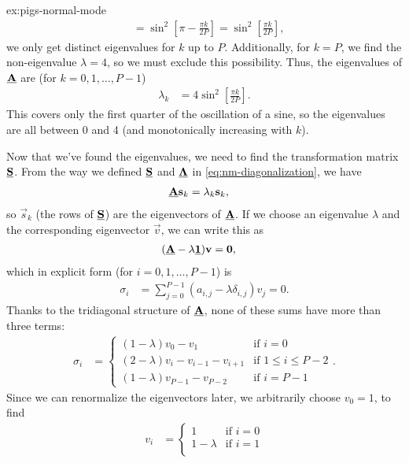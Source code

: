 \begin{DefAnswer}{ex:pigs-normal-mode}
\begin{align}
		&= \sin^2{\left[ \pi - \frac{\pi k}{2 P} \right]}
		= \sin^2{\left[ \frac{\pi k}{2 P} \right]},
	\end{align}
	we only get distinct eigenvalues for $k$ up to $P$.
	Additionally, for $k = P$, we find the non-eigenvalue $\lambda = 4$, so we must exclude this possibility.
	Thus, the eigenvalues of $\underline{\bm{\mathbf{A}}}$ are (for $k = 0, 1, \ldots, P - 1$)
	\begin{align}
		\lambda_k
		&= 4 \sin^2{\left[ \frac{\pi k}{2 P} \right]}.
	\end{align}
	This covers only the first quarter of the oscillation of a sine, so the eigenvalues are all between 0 and 4 (and monotonically increasing with $k$).

	Now that we've found the eigenvalues, we need to find the transformation matrix $\underline{\bm{\mathbf{S}}}$.
	From the way we defined $\underline{\bm{\mathbf{S}}}$ and $\underline{\bm{\mathbf{\Lambda}}}$ in \cref{eq:nm-diagonalization}, we have
	\begin{align}
		\underline{\bm{\mathbf{A}}} \bm{\mathbf{s}}_k
		&= \lambda_k \bm{\mathbf{s}}_k,
	\end{align}
	so $\vec{s}_k$ (the rows of $\underline{\bm{\mathbf{S}}}$) are the eigenvectors of $\underline{\bm{\mathbf{A}}}$.
	If we choose an eigenvalue $\lambda$ and the corresponding eigenvector $\vec{v}$, we can write this as
	\begin{align}
		(\underline{\bm{\mathbf{A}}} - \lambda \underline{\bm{\mathbf{1}}}) \bm{\mathbf{v}}
		&= \bm{\mathbf{0}},
	\end{align}
	which in explicit form (for $i = 0, 1, \ldots, P - 1$) is
	\begin{align}
		\sigma_i
		&= \sum_{j=0}^{P-1} (a_{i,j} - \lambda \delta_{i,j}) v_j
		= 0.
	\end{align}
	Thanks to the tridiagonal structure of $\underline{\bm{\mathbf{A}}}$, none of these sums have more than three terms:
	\begin{align}
		\sigma_i
		&= \begin{cases}
				(1 - \lambda) v_0 - v_1 & \text{if } i = 0 \\
				(2 - \lambda) v_i - v_{i-1} - v_{i+1} & \text{if } 1 \le i \le P - 2 \\
				(1 - \lambda) v_{P-1} - v_{P-2} & \text{if } i = P - 1
			\end{cases}.
	\end{align}
	Since we can renormalize the eigenvectors later, we arbitrarily choose $v_0 = 1$, to find
	\begin{align}
		v_i
		&= \begin{cases}
				1 & \text{if } i = 0 \\
				1 - \lambda & \text{if } i = 1 \\

\end{cases}
\end{align}
\end{DefAnswer}
